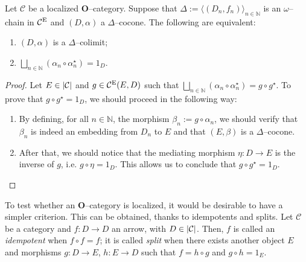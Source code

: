 \begin{thm}\label{thm:3-2}
  Let \(\mathcal{C}\) be a localized \(\mathbf{O}\)--category.
  Suppose that \(\Delta := {\langle(D_n,f_n)\rangle}_{n \in \mathbb{N}}\) is an \(\omega\)--chain in \(\mathcal{C}^\textup{E}\) and \((D,\alpha)\) a \(\Delta\)--cocone. %
  The following are equivalent:
  \begin{enumerate}
    \item \((D,\alpha)\) is a \(\Delta{}\)--colimit;
    \item \(\bigsqcup_{n \in \mathbb{N}}(\alpha_n \circ \alpha_n^\star) = 1_D\).
  \end{enumerate}
\end{thm}
\begin{proof}
  Let \(E \in \lvert \mathcal{C} \rvert\) and \(g \in \mathcal{C}^\textup{E}(E,D)\) such that \(\bigsqcup_{n \in \mathbb{N}}(\alpha_n \circ \alpha_n^\star) = g \circ g^\star\). %
  To prove that \(g \circ g^\star = 1_D\), we should proceed in the following way:
  \begin{enumerate}
    \item By defining, for all \(n \in \mathbb{N}\), the morphism \(\beta_n := g \circ \alpha_n\), we should verify that \(\beta_n\) is indeed an embedding from \(D_n\) to \(E\) and that \((E,\beta)\) is a \(\Delta\)--cocone. %
    \item After that, we should notice that the mediating morphism \(\eta \colon D \to E\) is the inverse of \(g\), i.e. \(g \circ \eta = 1_D\).
    This allows us to conclude that \(g \circ g^\star = 1_D\). \qedhere
  \end{enumerate}
\end{proof}

To test whether an \(\mathbf{O}\)--category is localized, it would be desirable to have a simpler criterion. This can be obtained, thanks to idempotents and splits. Let \(\mathcal{C}\) be a category and \(f \colon D \to D\) an arrow, with \(D \in \lvert \mathcal{C} \rvert\). Then, \(f\) is called an \emph{idempotent} when \(f \circ f = f\); it is called \emph{split} when there exists another object \(E\) and morphisms \(g \colon D \to E\), \(h \colon E \to D\) such that \(f = h \circ g\) and \(g \circ h = 1_E\).
\begin{center}
\end{center}

